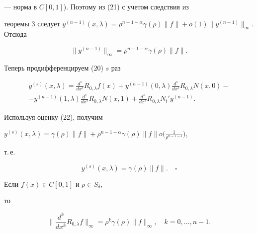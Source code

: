 --- норма в $C[0,1]$). Поэтому из (21) с учетом следствия из


теоремы 3 следует $y^{(n-1)}(x,\lambda)=\rho^{n-1-\alpha}


\gamma(\rho)\|f\|+o(1)\|y^{(n-1)}\|_\infty$. Отсюда


\begin{equation}


\|y^{(n-1)}\|_\infty=\rho^{n-1-\alpha}\gamma(\rho)\|f\|.


\end{equation}





Теперь продифференцируем (20) $s$ раз


\begin{multline*}


y^{(s)}(x,\lambda)=\frac {d^s}{dx^s}R_{0,\lambda}f(x)+y^{(n-1)}


(0,\lambda)\frac {d^s}{dx^s}R_{0,\lambda}N(x,0)- \\


%


-y^{(n-1)}(1,\lambda)\frac{d^s}{dx^s}R_{0,\lambda}N(x,1)+


\frac {d^s}{dx^s}R_{0,\lambda}N_t'y^{(n-1)}.


\end{multline*}





Используя оценку (22), получим


$y^{(s)}(x,\lambda)=\gamma(\rho)\|f\|+


\rho^{n-1-\alpha}\gamma(\rho)\|f\|o\big(\frac 1{\rho^{n-1-s}}\big)$,


т.\,е.


$$


y^{(s)}(x,\lambda)=\gamma(\rho)\|f\|.\quad\square


$$





\begin{lem}


Если $f(x)\in C[0,1]$ и $\rho\in S_\delta$,


то


$$


\bigg\|\frac {d^k}{dx^k}R_{0,\lambda}f\bigg\|_\infty=\rho^k\gamma


(\rho)\|f\|_\infty,\quad k=0,\dotsc,n-1.


$$


\end{lem}





